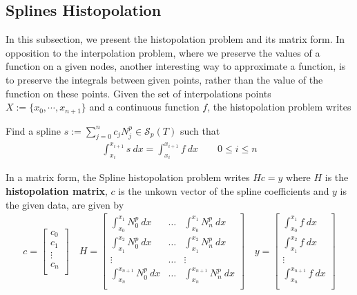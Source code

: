 \subsection{Splines Histopolation}
In this subsection, we present the histopolation problem and its matrix form.
In opposition to the interpolation problem, where we preserve the values of a function on a given nodes, another interesting way to approximate a function,  is to preserve the integrals between given points, rather than the value of the function on these points. Given the set of interpolations points $X:=\{ x_0, \cdots,x_{n+1} \}$ and a continuous function $f$, the histopolation problem writes 
\begin{definition}
  Find a spline $s := \sum\limits_{j=0}^{n} c_j N_j^p \in \mathcal{S}_p(T)$ such that
  \begin{align}
    \int_{x_i}^{x_{i+1}} s ~dx = \int_{x_i}^{x_{i+1}} f ~dx \quad \quad 0 \leq i \leq n
  \end{align}
\end{definition}
\noindent
In a matrix form, the Spline histopolation problem writes $ H c = y $ where $H$ is the \textbf{histopolation matrix}, $c$ is the unkown vector of the spline coefficients and $y$ is the given data, are given by
\begin{align*}
  c =  
  \begin{bmatrix}
    c_0\\
    c_1\\
    \vdots    \\ 
    c_n\\
  \end{bmatrix}
  \quad
  H = 
  \begin{bmatrix}
    \int_{x_0}^{x_{1}}N_0^p ~dx   & \ldots & \int_{x_0}^{x_{1}}N_n^p ~dx   \\
    \int_{x_1}^{x_{2}}N_0^p ~dx   & \ldots & \int_{x_1}^{x_{2}}N_n^p ~dx   \\
    \vdots                        & \ldots &                        \vdots \\
    \int_{x_n}^{x_{n+1}}N_0^p ~dx & \ldots & \int_{x_n}^{x_{n+1}}N_n^p ~dx \\
  \end{bmatrix}
  \quad
  y =  
  \begin{bmatrix}
    \int_{x_0}^{x_{1}}f ~dx\\
    \int_{x_1}^{x_{2}}f ~dx\\
    \vdots    \\ 
    \int_{x_n}^{x_{n+1}}f ~dx\\
  \end{bmatrix}
\end{align*}
